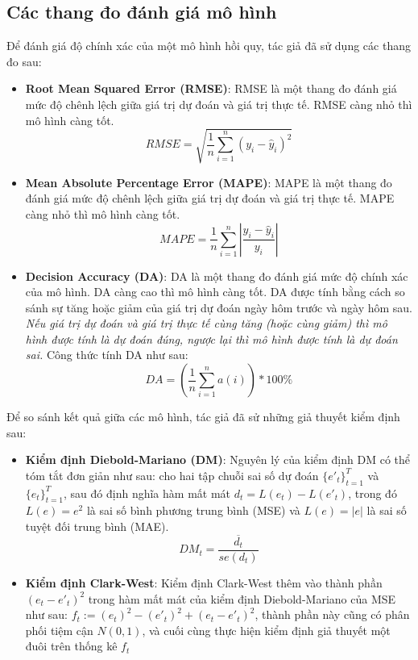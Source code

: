 \subsection{Các thang đo đánh giá mô hình}\label{sec: metrics}
Để đánh giá độ chính xác của một mô hình hồi quy, tác giả đã sử dụng các thang đo sau:
\begin{itemize}
    \item \textbf{Root Mean Squared Error (RMSE)}: RMSE là một thang đo đánh giá mức độ chênh lệch giữa giá trị dự đoán và giá trị thực tế. RMSE càng nhỏ thì mô hình càng tốt.
    \begin{equation}
        RMSE = \sqrt{\frac{1}{n}\sum_{i=1}^{n}(y_i - \hat{y}_i)^2}
    \end{equation}
    \item \textbf{Mean Absolute Percentage Error (MAPE)}: MAPE là một thang đo đánh giá mức độ chênh lệch giữa giá trị dự đoán và giá trị thực tế. MAPE càng nhỏ thì mô hình càng tốt.
    \begin{equation}
        MAPE = \frac{1}{n}\sum_{i=1}^{n}\left|\frac{y_i - \hat{y}_i}{y_i}\right|
    \end{equation}
    \item \textbf{Decision Accuracy (DA)}: DA là một thang đo đánh giá mức độ chính xác của mô hình. DA càng cao thì mô hình càng tốt. DA được tính bằng cách so sánh sự tăng hoặc giảm của giá trị dự đoán ngày hôm trước và ngày hôm sau. \textit{Nếu giá trị dự đoán và giá trị thực tế cùng tăng (hoặc cùng giảm) thì mô hình được tính là dự đoán đúng, ngược lại thì mô hình được tính là dự đoán sai.} Công thức tính DA như sau:
    \begin{equation}
        DA = (\frac{1}{n}\sum_{i=1}^{n}a(i)) * 100\%
    \end{equation}
\end{itemize}

Để so sánh kết quả giữa các mô hình, tác giả đã sử những giả thuyết kiểm định sau:
\begin{itemize}
   \item \textbf{Kiểm định Diebold-Mariano (DM)}: Nguyên lý của kiểm định DM có thể tóm tắt đơn giản như sau: cho hai tập chuỗi sai số dự đoán ${\{e'_t\}}^T_{t=1}$ và ${\{e_t\}}^T_{t=1}$, sau đó định nghĩa hàm mất mát $d_t = L(e_t) - L(e'_t)$, trong đó $L(e) = e^2$ là sai số bình phương trung bình (MSE) và $L(e) = |e|$ là sai số tuyệt đối trung bình (MAE).
   \begin{equation}
    DM_t = \frac{\overline{d_t}}{se(d_t)}
   \end{equation}
   \item \textbf{Kiểm định Clark-West}: Kiểm định Clark-West thêm vào thành phần $(e_t - e'_t)^2$ trong hàm mất mát của kiểm định Diebold-Mariano của MSE như sau: $f_t := (e_t)^2 - (e'_t)^2 + (e_t - e'_t)^2$, thành phần này cũng có phân phối tiệm cận $N(0,1)$, và cuối cùng thực hiện kiểm định giả thuyết một đuôi trên thống kê $f_t$
\end{itemize}

